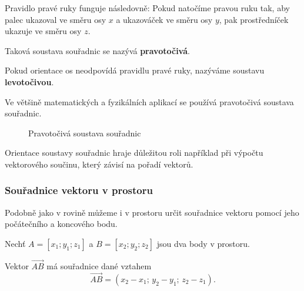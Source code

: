 Pravidlo pravé ruky funguje následovně:
Pokud natočíme pravou ruku tak, aby palec ukazoval ve směru osy $x$
a ukazováček ve směru osy $y$, pak prostředníček ukazuje ve směru osy $z$.

Taková soustava souřadnic se nazývá \textbf{pravotočivá}.

\begin{definition}\label{def:left_handed_basis}
    Pokud orientace os neodpovídá pravidlu pravé ruky,
    nazýváme soustavu \textbf{levotočivou}.
\end{definition}

\begin{remark}
    Ve většině matematických a fyzikálních aplikací se používá pravotočivá soustava souřadnic.
\end{remark}

\begin{figure}[H]
    \centering
    \caption{Pravotočivá soustava souřadnic}
\end{figure}

\begin{remark}
    Orientace soustavy souřadnic hraje důležitou roli například při výpočtu vektorového součinu,
    který závisí na pořadí vektorů.
\end{remark}



\subsubsection{Souřadnice vektoru v prostoru}\label{subsubsec:Coordinates_of_vector_in_space}

Podobně jako v rovině můžeme i v prostoru určit souřadnice vektoru pomocí jeho počátečního a koncového bodu.

Nechť $A = [x_1; y_1; z_1]$ a $B = [x_2; y_2; z_2]$ jsou dva body v prostoru.

\begin{definition}\label{def:vector_coordinates_space}
    Vektor $\overrightarrow{AB}$ má souřadnice dané vztahem
    \begin{equation}\label{eq:vector_coordinates_space}
        \overrightarrow{AB} = (x_2 - x_1;\, y_2 - y_1;\, z_2 - z_1).
    \end{equation}
\end{definition}

